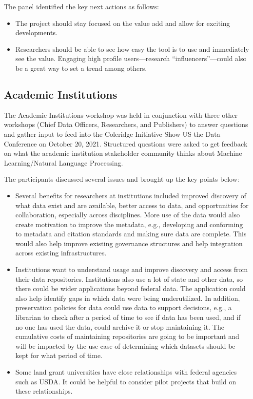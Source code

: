 \documentclass[titlepage, 11pt]{article}
\begin{document}
{\begin{itemize}
\end{itemize}

The panel identified the key next actions as follows: 

\begin{itemize}
    \item The project should stay focused on the value add and allow for exciting developments.
    \item Researchers should be able to see how easy the tool is to use and immediately see the value. Engaging high profile users—research “influencers”—could also be a great way to set a trend among others. 

\end{itemize}

\subsection*{Academic Institutions}\label{subsec:Academicinstitutions}
The Academic Institutions workshop was held in conjunction with three other workshops (Chief Data Officers, Researchers, and Publishers) to answer questions and gather input to feed into the Coleridge Initiative Show US the Data Conference on October 20, 2021. Structured questions were asked to get feedback on what the academic institution stakeholder community thinks about Machine Learning/Natural Language Processing. 

The participants discussed several issues and brought up the key points below:
\begin{itemize}
    \item Several benefits for researchers at institutions included improved discovery of what data exist and are available, better access to data, and opportunities for collaboration, especially across disciplines.  More use of the data would also create motivation to improve the metadata, e.g., developing and conforming to metadata and citation standards and making sure data are complete. This would also help improve existing governance structures and help integration across existing infrastructures.
    \item Institutions want to understand usage and improve discovery and access from their data repositories. Institutions also use a lot of state and other data, so there could be wider applications beyond federal data.  The application could also help identify gaps in which data were being underutilized.  In addition, preservation policies for data could use data to support decisions, e.g., a librarian to check after a period of time to see if data has been used, and if no one has used the data, could archive it or stop maintaining it. The cumulative costs of maintaining repositories are going to be important and will be impacted by the use case of determining which datasets should be kept for what period of time. 
    \item Some land grant universities have close relationships with federal agencies such as USDA. It could be helpful to consider pilot projects that build on these relationships.


\end{itemize}}
\end{document}
